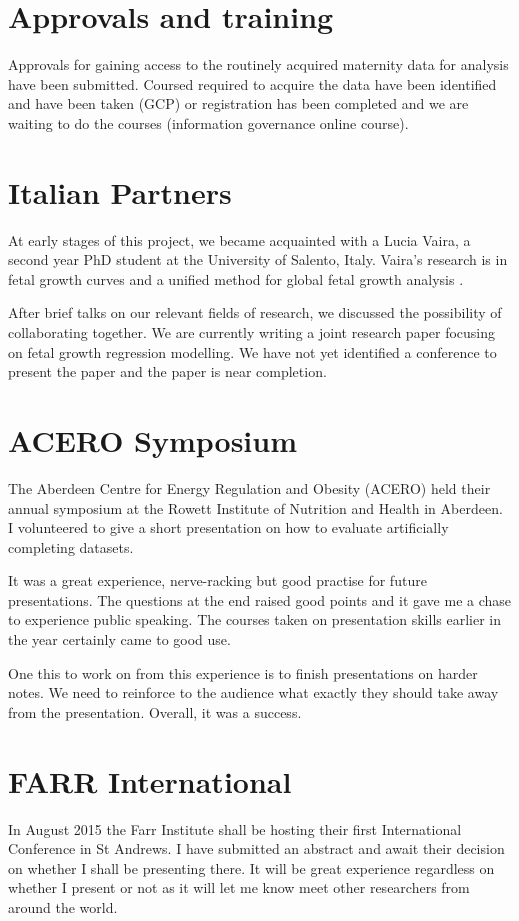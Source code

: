 \documentclass[bsc]{abdnthesis}
\begin{document}
\section{Approvals and training} %
\label{sec:approvals_and_training}
Approvals for gaining access to the routinely acquired maternity data for analysis have been submitted. Coursed required to acquire the data have been identified and have been taken (GCP) or registration has been completed and we are waiting to do the courses (information governance online course).
\section{Italian Partners} %
\label{sec:italian_partners}
At early stages of this project, we became acquainted with a Lucia Vaira, a second year PhD student at the University of Salento, Italy. Vaira's research is in fetal growth curves and a unified method for global fetal growth analysis \cite{ luccia1, luccia2, luccia3}. 

After brief talks on our relevant fields of research, we discussed the possibility of collaborating together. We are currently writing a joint research paper focusing on fetal growth regression modelling. We have not yet identified a conference to present the paper and the paper is near completion. 
\section{ACERO Symposium} %
\label{sec:acero_symposium}
The Aberdeen Centre for Energy Regulation and Obesity (ACERO) held their annual symposium at the Rowett Institute of Nutrition and Health in Aberdeen\cite{ acero}. I volunteered to give a short presentation on how to evaluate artificially completing datasets. 

It was a great experience, nerve-racking but good practise for future presentations. The questions at the end raised good points and it gave me a chase to experience public speaking. The courses taken on presentation skills earlier in the year certainly came to good use. 

One this to work on from this experience is to finish presentations on harder notes. We need to reinforce to the audience what exactly they should take away from the presentation. Overall, it was a success. 
\section{FARR International} %
\label{sec:farr_international}
In August 2015 the Farr Institute shall be hosting their first International Conference in St Andrews\cite{ farr}. I have submitted an abstract and await their decision on whether I shall be presenting there. It will be great experience regardless on whether I present or not as it will let me know meet other researchers from around the world. 
\end{document}
